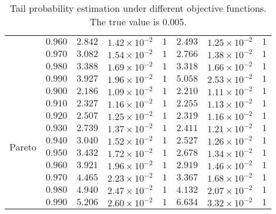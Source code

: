 \begin{table}[ht]
{\begin{tabular}{cc|ccc|ccc}
&$0.960$ & $2.842$ & $1.42\times 10^{-2}$ & $ 1$ & $2.493$ & $1.25\times 10^{-2}$ & $ 1$\\
&$0.970$ & $3.082$ & $1.54\times 10^{-2}$ & $ 1$ & $2.766$ & $1.38\times 10^{-2}$ & $ 1$\\
&$0.980$ & $3.388$ & $1.69\times 10^{-2}$ & $ 1$ & $3.318$ & $1.66\times 10^{-2}$ & $ 1$\\
&$0.990$ & $3.927$ & $1.96\times 10^{-2}$ & $ 1$ & $5.058$ & $2.53\times 10^{-2}$ & $ 1$\\\hline 
\multirow{10}{*}{Pareto}&$0.900$ & $2.186$ & $1.09\times 10^{-2}$ & $ 1$ & $2.210$ & $1.11\times 10^{-2}$ & $ 1$\\
&$0.910$ & $2.327$ & $1.16\times 10^{-2}$ & $ 1$ & $2.255$ & $1.13\times 10^{-2}$ & $ 1$\\
&$0.920$ & $2.507$ & $1.25\times 10^{-2}$ & $ 1$ & $2.319$ & $1.16\times 10^{-2}$ & $ 1$\\
&$0.930$ & $2.739$ & $1.37\times 10^{-2}$ & $ 1$ & $2.411$ & $1.21\times 10^{-2}$ & $ 1$\\
&$0.940$ & $3.040$ & $1.52\times 10^{-2}$ & $ 1$ & $2.527$ & $1.26\times 10^{-2}$ & $ 1$\\
&$0.950$ & $3.432$ & $1.72\times 10^{-2}$ & $ 1$ & $2.678$ & $1.34\times 10^{-2}$ & $ 1$\\
&$0.960$ & $3.921$ & $1.96\times 10^{-2}$ & $ 1$ & $2.919$ & $1.46\times 10^{-2}$ & $ 1$\\
&$0.970$ & $4.465$ & $2.23\times 10^{-2}$ & $ 1$ & $3.367$ & $1.68\times 10^{-2}$ & $ 1$\\
&$0.980$ & $4.940$ & $2.47\times 10^{-2}$ & $ 1$ & $4.132$ & $2.07\times 10^{-2}$ & $ 1$\\
&$0.990$ & $5.206$ & $2.60\times 10^{-2}$ & $ 1$ & $6.634$ & $3.32\times 10^{-2}$ & $ 1$\\
    \hline
    \bottomrule
    \end{tabular}}\caption{Tail probability estimation under different objective functions. The true value is 0.005.}
    \label{tb4_tpe_0.7}
\end{table}